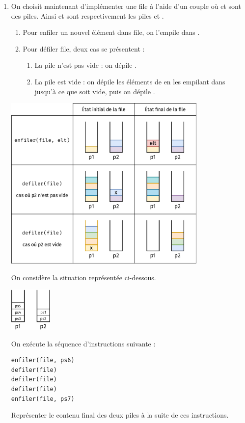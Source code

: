 \documentclass[a4paper,12pt,french]{book}
\begin{document}
\begin{enumerate}[\bfseries 1.]
        \item On choisit maintenant d'implémenter une file  à l'aide d'un couple  où  et  sont des piles. Ainsi  et  sont respectivement les piles  et .
        \begin{enumerate}[--]
            \item Pour enfiler un nouvel élément  dans file, on l'empile dans .
            \item Pour défiler file, deux cas se présentent :
            \begin{enumerate}[\textbullet]
                \item La pile  n'est pas vide : on dépile .
                \item La pile  est vide : on dépile les éléments de  en les empilant dans  jusqu'à ce que  soit vide, puis on dépile .
            \end{enumerate}
        \end{enumerate}
        \begin{center}
            \includegraphics[width=10cm]{img/file2piles}
        \end{center}
        On considère la situation représentée ci-dessous.
        \begin{center}
            \includegraphics[width=2.1cm]{img/file2piles2}
        \end{center}
        On exécute la séquence d'instructions suivante :
\begin{verbatim}
enfiler(file, ps6)
defiler(file)
defiler(file)
defiler(file)
enfiler(file, ps7)
\end{verbatim}
        Représenter le contenu final des deux piles à la suite de ces instructions.



\end{enumerate}
\end{document}
